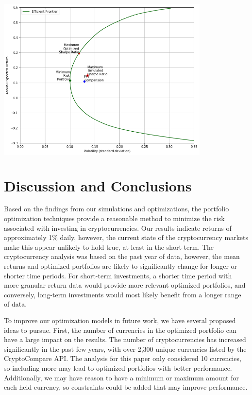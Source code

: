 \documentclass[12pt]{article} %
\begin{document}
\includegraphics[width=0.8\textwidth]{sp1}
 
\section{Discussion and Conclusions}

Based on the findings from our simulations and optimizations, the portfolio optimization techniques provide a reasonable method to minimize the risk associated with investing in cryptocurrencies. Our results indicate returns of approximately 1\% daily, however, the current state of the cryptocurrency markets make this appear unlikely to hold true, at least in the short-term. The cryptocurrency analysis was based on the past year of data, however, the mean returns and optimized portfolios are likely to significantly change for longer or shorter time periods. For short-term investments, a shorter time period with more granular return data would provide more relevant optimized portfolios, and conversely, long-term investments would most likely benefit from a longer range of data.

To improve our optimization models in future work, we have several proposed ideas to pursue. First, the number of currencies in the optimized portfolio can have a large impact on the results. The number of cryptocurrencies has increased significantly in the past few years, with over 2,300 unique currencies listed by the CryptoCompare API. The analysis for this paper only considered 10 currencies, so including more may lead to optimized portfolios with better performance. Additionally, we may have reason to have a minimum or maximum amount for each held currency, so constraints could be added that may improve performance.
\end{document}
